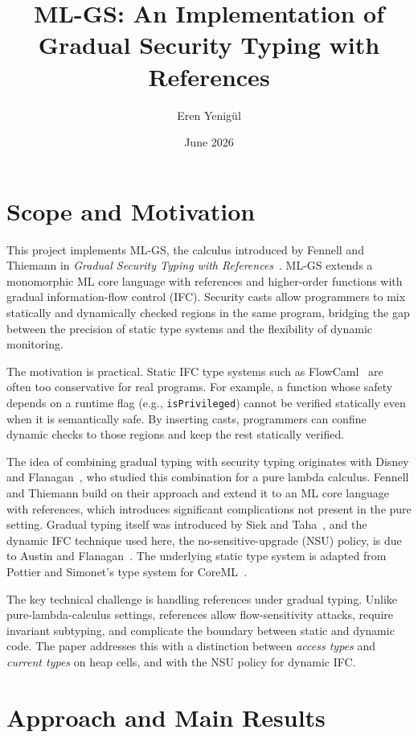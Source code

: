 \documentclass[11pt,a4paper]{article}
\title{\textbf{ML-GS: An Implementation of Gradual Security Typing with References}}
\author{Eren Yenigül}
\date{June 2026}
\begin{document}
\maketitle

\section{Scope and Motivation}

This project implements ML-GS, the calculus introduced by Fennell and Thiemann in
\emph{Gradual Security Typing with References}~\cite{fennell2013}. ML-GS extends a
monomorphic ML core language with references and higher-order functions with gradual
information-flow control (IFC). Security casts allow programmers to mix statically and
dynamically checked regions in the same program, bridging the gap between the precision of
static type systems and the flexibility of dynamic monitoring.

The motivation is practical. Static IFC type systems such as FlowCaml~\cite{pottier2003}
are often too conservative for real programs. For example, a function whose safety depends
on a runtime flag (e.g., \texttt{isPrivileged}) cannot be verified statically even when it
is semantically safe. By inserting casts, programmers can confine dynamic checks to those
regions and keep the rest statically verified.

The idea of combining gradual typing with security typing originates with Disney and
Flanagan~\cite{disney2011}, who studied this combination for a pure lambda calculus.
Fennell and Thiemann build on their approach and extend it to an ML core language with
references, which introduces significant complications not present in the pure setting.
Gradual typing itself was introduced by Siek and Taha~\cite{siek2006}, and the dynamic IFC
technique used here, the no-sensitive-upgrade (NSU) policy, is due to Austin and
Flanagan~\cite{austin2009}. The underlying static type system is adapted from Pottier and
Simonet's type system for CoreML~\cite{pottier2003}.

The key technical challenge is handling references under gradual typing. Unlike
pure-lambda-calculus settings, references allow flow-sensitivity attacks, require invariant
subtyping, and complicate the boundary between static and dynamic code. The paper addresses
this with a distinction between \emph{access types} and \emph{current types} on heap cells,
and with the NSU policy for dynamic IFC.

\section{Approach and Main Results}
\end{document}
